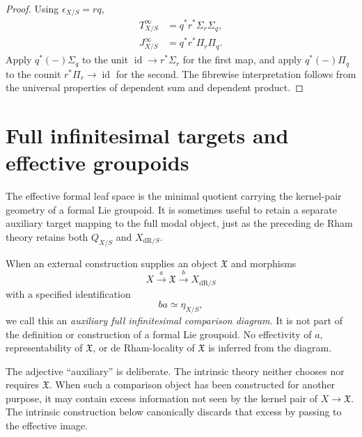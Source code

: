 \begin{proof}
Using $\epsilon_{X/S}=rq$,
\[
\begin{aligned}
    T^\infty_{X/S}
    &=
    q^*r^*\Sigma_r\Sigma_q,\\
    J^\infty_{X/S}
    &=
    q^*r^*\Pi_r\Pi_q.
\end{aligned}
\]
Apply $q^*(-)\Sigma_q$ to the unit
$\operatorname{id}\to r^*\Sigma_r$ for the first map, and apply
$q^*(-)\Pi_q$ to the counit $r^*\Pi_r\to\operatorname{id}$ for the second.
The fibrewise interpretation follows from the universal properties of
dependent sum and dependent product.
\end{proof}

\section{Full infinitesimal targets and effective groupoids}
\label{sec:flg-full-effective}

The effective formal leaf space is the minimal quotient carrying the
kernel-pair geometry of a formal Lie groupoid.  It is sometimes useful to
retain a separate auxiliary target mapping to the full modal object, just as
the preceding de Rham theory retains both $Q_{X/S}$ and
$X_{\mathrm{dR}/S}$.

\begin{definition}
\label{def:full-infinitesimal-target}
When an external construction supplies an object $\mathfrak X$ and morphisms
\[
    X
    \xrightarrow{a}
    \mathfrak X
    \xrightarrow{b}
    X_{\mathrm{dR}/S}
\]
with a specified identification
\[
    ba\simeq\eta_{X/S},
\]
we call this an \emph{auxiliary full infinitesimal comparison diagram}.
It is not part of the definition or construction of a formal Lie groupoid.
No effectivity of $a$, representability of $\mathfrak X$, or de Rham-locality
of $\mathfrak X$ is inferred from the diagram.
\end{definition}

\begin{remark}
The adjective ``auxiliary'' is deliberate.  The intrinsic theory neither
chooses nor requires $\mathfrak X$.  When such a comparison object has been
constructed for another purpose, it may contain excess information not seen
by the kernel pair of $X\to\mathfrak X$.  The intrinsic construction below
canonically discards that excess by passing to the effective image.
\end{remark}

